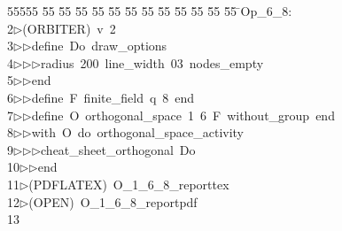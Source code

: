 %
%
\begin{tabbing}
55555 \= 55 \= 55 \= 55 \= 55 \= 55 \= 55 \= 55 \= 55 \= 55 \= 55 \= 55 \= 55 \= \>Op\_6\_8:\\[0pt]
2\>$\triangleright$\>(ORBITER)\ v\ 2\ \\[0pt]
3\>$\triangleright$\>$\triangleright$\>define\ Do\ draw\_options\ \\[0pt]
4\>$\triangleright$\>$\triangleright$\>$\triangleright$\>radius\ 200\ line\_width\ 03\ nodes\_empty\ \\[0pt]
5\>$\triangleright$\>$\triangleright$\>end\ \\[0pt]
6\>$\triangleright$\>$\triangleright$\>define\ F\ finite\_field\ q\ 8\ end\ \\[0pt]
7\>$\triangleright$\>$\triangleright$\>define\ O\ orthogonal\_space\ 1\ 6\ F\ without\_group\ end\ \\[0pt]
8\>$\triangleright$\>$\triangleright$\>with\ O\ do\ orthogonal\_space\_activity\ \\[0pt]
9\>$\triangleright$\>$\triangleright$\>$\triangleright$\>cheat\_sheet\_orthogonal\ Do\ \\[0pt]
10\>$\triangleright$\>$\triangleright$\>end\\[0pt]
11\>$\triangleright$\>(PDFLATEX)\ O\_1\_6\_8\_reporttex\\[0pt]
12\>$\triangleright$\>(OPEN)\ O\_1\_6\_8\_reportpdf\\[0pt]
13\>\end{tabbing}
